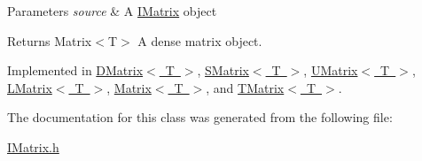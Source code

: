 \begin{DoxyParams}{Parameters}
{\em source} & A \mbox{\hyperlink{class_i_matrix}{I\+Matrix}} object \\
\hline
\end{DoxyParams}
\begin{DoxyReturn}{Returns}
Matrix$<$\+T$>$ A dense matrix object. 
\end{DoxyReturn}


Implemented in \mbox{\hyperlink{class_d_matrix_a7a06d954882f3853d3e735a6c550a715}{D\+Matrix$<$ T $>$}}, \mbox{\hyperlink{class_s_matrix_ae5950543920513f4ff263055666c1082}{S\+Matrix$<$ T $>$}}, \mbox{\hyperlink{class_u_matrix_a1f16f054b4df60b40751ca260983c2c5}{U\+Matrix$<$ T $>$}}, \mbox{\hyperlink{class_l_matrix_af215feeb6856f0dbe4800f8071c6013c}{L\+Matrix$<$ T $>$}}, \mbox{\hyperlink{class_matrix_a468aedc8546d97964f692a30f1e24f94}{Matrix$<$ T $>$}}, and \mbox{\hyperlink{class_t_matrix_a2208a6ce98de3552f4ddf749464e5c81}{T\+Matrix$<$ T $>$}}.



The documentation for this class was generated from the following file\+:\begin{DoxyCompactItemize}
\item 
\mbox{\hyperlink{_i_matrix_8h}{I\+Matrix.\+h}}\end{DoxyCompactItemize}
